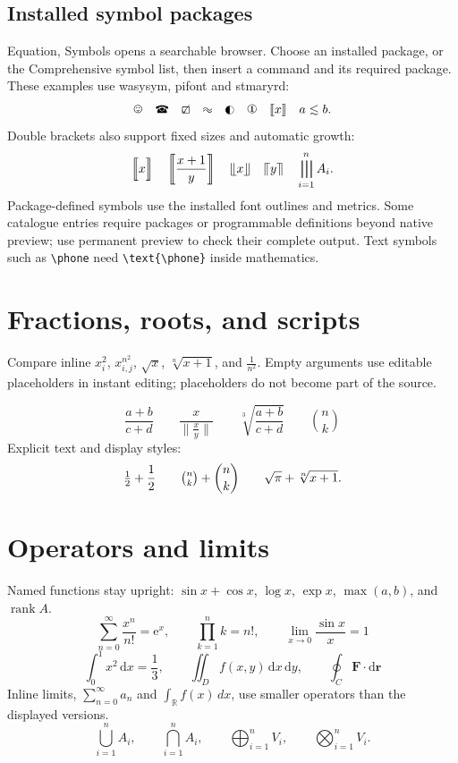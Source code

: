 \documentclass[12pt]{article}
\DeclareMathOperator{\rank}{rank}
\begin{document}
\subsection*{Installed symbol packages}
Equation, Symbols opens a searchable browser. Choose an installed package, or
the Comprehensive symbol list, then insert a command and its required package.
These examples use wasysym, pifont and stmaryrd:
\[
 \smiley\quad\text{\phone}\quad\CheckedBox\quad\HF\quad\LEFTcircle\quad
 \text{\ding{172}}\quad\llbracket x\rrbracket\quad a\apprle b.
\]
Double brackets also support fixed sizes and automatic growth:
\[
 \Bigl\llbracket x\Bigr\rrbracket\quad
 \left\llbracket\frac{x+1}{y}\right\rrbracket\quad
 \llfloor x\rrfloor\quad\llceil y\rrceil\quad
 \biginterleave_{i=1}^{n} A_i.
\]
Package-defined symbols use the installed font outlines and metrics. Some
catalogue entries require packages or programmable definitions beyond native
preview; use permanent preview to check their complete output.
Text symbols such as \verb|\phone| need \verb|\text{\phone}| inside mathematics.

\section{Fractions, roots, and scripts}
Compare inline $x_i^2$, $x^{n^2}_{i,j}$, $\sqrt{x}$, $\sqrt[n]{x+1}$,
and $\frac{1}{n^2}$. Empty arguments use editable placeholders in instant
editing; placeholders do not become part of the source.

\[
 \frac{a+b}{c+d}\qquad
 \frac{x}{\lVert\frac{x}{y}\rVert}\qquad
 \sqrt[3]{\frac{a+b}{c+d}}\qquad
 \binom{n}{k}
\]
Explicit text and display styles:
\[
 \tfrac{1}{2}+\dfrac{1}{2}\qquad
 \tbinom{n}{k}+\dbinom{n}{k}\qquad
 \sqrt{\pi}+\sqrt[n]{x+1}.
\]

\section{Operators and limits}
Named functions stay upright: $\sin x+\cos x$, $\log x$, $\exp x$,
$\max(a,b)$, and $\rank A$.
\[
 \sum_{n=0}^{\infty}\frac{x^n}{n!}=\mathrm{e}^x,\qquad
 \prod_{k=1}^{n}k=n!,\qquad
 \lim_{x\to0}\frac{\sin x}{x}=1
\]
\[
 \int_0^1x^2\,\mathrm{d}x=\frac{1}{3},\qquad
 \iint_D f(x,y)\,\mathrm{d}x\,\mathrm{d}y,\qquad
 \oint_C\bm{F}\cdot\mathrm{d}\bm{r}
\]
Inline limits, $\sum_{n=0}^{\infty}a_n$ and $\int_{\mathbb{R}}f(x)\,dx$,
use smaller operators than the displayed versions.
\[
 \bigcup_{i=1}^n A_i,\qquad
 \bigcap_{i=1}^n A_i,\qquad
 \bigoplus_{i=1}^n V_i,\qquad
 \bigotimes_{i=1}^n V_i.
\]
\end{document}
